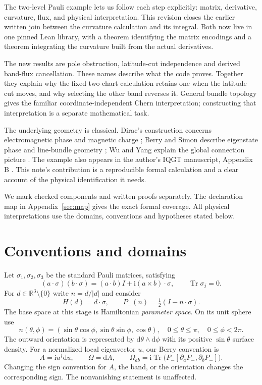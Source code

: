 \documentclass[11pt]{article}
\theoremstyle{definition}\newtheorem{definition}[theorem]{Definition}
\theoremstyle{remark}\newtheorem{remark}[theorem]{Remark}
\newcommand{\Tr}{\operatorname{Tr}}
\newcommand{\ii}{\mathrm{i}}
\newcommand{\dd}{\mathrm{d}}
\newcommand{\R}{\mathbb{R}}
\begin{document}
The two-level Pauli example lets us follow each step explicitly: matrix, derivative, curvature, flux, and physical interpretation. This revision closes the earlier written join between the curvature calculation and its integral. Both now live in one pinned Lean library, with a theorem identifying the matrix encodings and a theorem integrating the curvature built from the actual derivatives.

The new results are pole obstruction, latitude-cut independence and derived band-flux cancellation. These names describe what the code proves. Together they explain why the fixed two-chart calculation retains one when the latitude cut moves, and why selecting the other band reverses it. General bundle topology gives the familiar coordinate-independent Chern interpretation; constructing that interpretation is a separate mathematical task.

The underlying geometry is classical. Dirac's construction concerns electromagnetic phase and magnetic charge \cite{dirac}; Berry and Simon describe eigenstate phase and line-bundle geometry \cite{berry,simon}; Wu and Yang explain the global connection picture \cite{wuyang}. The example also appears in the author's IQGT manuscript, Appendix B \cite{iqgt}. This note's contribution is a reproducible formal calculation and a clear account of the physical identification it needs.

We mark checked components and written proofs separately. The declaration map in Appendix~\ref{sec:map} gives the exact formal coverage. All physical interpretations use the domains, conventions and hypotheses stated below.

\section{Conventions and domains}
Let $\sigma_1,\sigma_2,\sigma_3$ be the standard Pauli matrices, satisfying
\begin{equation}\label{eq:pauli}
 (a\cdot\sigma)(b\cdot\sigma)=(a\cdot b)I+\ii(a\times b)\cdot\sigma,
 \qquad \Tr\sigma_j=0.
\end{equation}
For $d\in\R^3\setminus\{0\}$ write $n=d/|d|$ and consider
\begin{equation}\label{eq:h}
 H(d)=d\cdot\sigma,\qquad P_-(n)=\tfrac12(I-n\cdot\sigma).
\end{equation}
The base space at this stage is Hamiltonian \emph{parameter space}. On its unit sphere use
\begin{equation}\label{eq:n}
 n(\theta,\phi)=(\sin\theta\cos\phi,\sin\theta\sin\phi,\cos\theta),
 \quad 0\leq\theta\leq\pi,\quad 0\leq\phi<2\pi.
\end{equation}
The outward orientation is represented by $\dd\theta\wedge\dd\phi$ with its positive $\sin\theta$ surface density. For a normalized local eigenvector $u$, our Berry convention is
\begin{equation}\label{eq:berryconv}
 A=\ii u^\dagger\dd u,\qquad \Omega=\dd A,
 \qquad \Omega_{ab}=\ii\Tr\bigl(P_-[\partial_aP_-,\partial_bP_-]\bigr).
\end{equation}
Changing the sign convention for $A$, the band, or the orientation changes the corresponding sign. The nonvanishing statement is unaffected.
\end{document}
